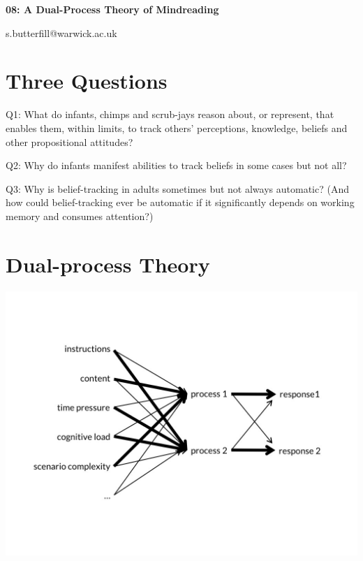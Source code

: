 \documentclass[12pt]{extarticle}
\date{}
\makeatletter
\def \ititle {Philosophical Psychology}
\def \iemail{s.butterfill@warwick.ac.uk}
\makeatother
\begin{document}
\begin{multicols*}{3}

\setlength\footnotesep{1em}











\def \ititle {08: A Dual-Process Theory of Mindreading}

\begin{center}

{\Large

\textbf{\ititle}

}



\iemail %

\end{center}

\section{Three Questions}

Q1: What do infants, chimps and scrub-jays reason about, or represent, that enables them, within limits, to track others’ perceptions, knowledge, beliefs and other propositional attitudes?

Q2: Why do infants manifest abilities to track beliefs in some cases but not all?

Q3: Why is belief-tracking in adults sometimes but not always automatic?
(And how could belief-tracking ever be automatic if it significantly depends on working memory and consumes attention?)


\section{Dual-process Theory}

\begin{center}
\includegraphics[scale=0.3]{img/dual_process_operationalized_11.neg.jpg}
\end{center}


\end{multicols*}
\end{document}
